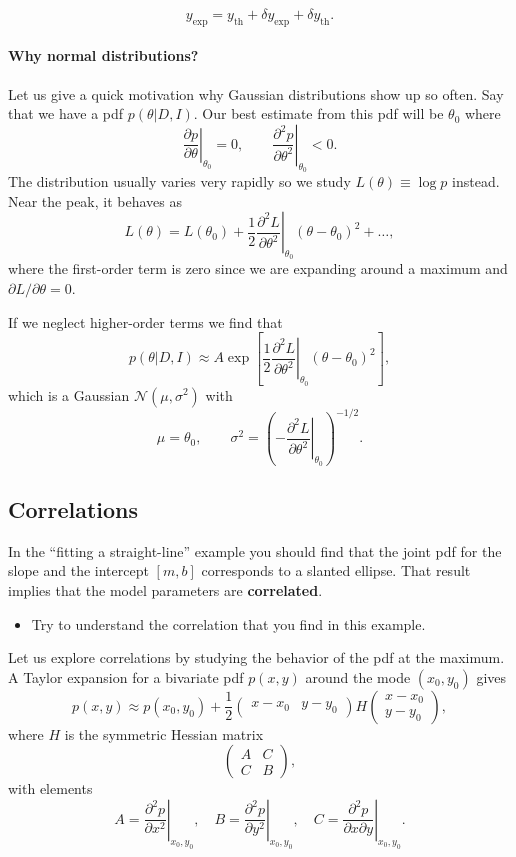 \documentclass[%
oneside,                 %
final,                   %
10pt]{article}
\begin{document}
\noindent
\[
y_\mathrm{exp} = y_\mathrm{th} + \delta y_\mathrm{exp} + \delta y_\mathrm{th}.
\]

\paragraph{Why normal distributions?}
Let us give a quick motivation why Gaussian distributions show up so often. Say that we have a pdf $p(\theta | D,I)$. Our best estimate from this pdf will be $\theta_0$ where
\[ 
\left. 
\frac{ \partial p }{ \partial \theta }
\right|_{\theta_0} = 0, \qquad
\left. \frac{ \partial^2 p }{ \partial \theta^2 }
\right|_{\theta_0} < 0.
\]
The distribution usually varies very rapidly so we study $L(\theta) \equiv \log p$ instead.
Near the peak, it behaves as
\[
L(\theta) = L(\theta_0) + \frac{1}{2} \left. \frac{\partial^2 L}{\partial \theta^2} \right|_{\theta_0} \left( \theta - \theta_0 \right)^2 + \ldots,
\]
where the first-order term is zero since we are expanding around a maximum and $\partial L / \partial\theta = 0$.

If we neglect higher-order terms we find that 
\[
p(\theta|D,I) \approx A \exp \left[ \frac{1}{2} \left. \frac{\partial^2 L}{\partial \theta^2} \right|_{\theta_0} \left( \theta - \theta_0 \right)^2  \right],
\]
which is a Gaussian $\mathcal{N}(\mu,\sigma^2)$ with
\[
\mu = \theta_0, \qquad \sigma^2 = \left( - \left. \frac{\partial^2 L}{\partial \theta^2} \right|_{\theta_0} \right)^{-1/2}.
\]

\subsection{Correlations}
In the ``fitting a straight-line'' example you should find that the joint pdf for the slope and the intercept $[m, b]$ corresponds to a slanted ellipse. That result implies that the model parameters are \textbf{correlated}.

\begin{itemize}
\item Try to understand the correlation that you find in this example.
\end{itemize}

\noindent
Let us explore correlations by studying the behavior of the pdf at the maximum.
A Taylor expansion for a bivariate pdf $p(x,y)$ around the mode $(x_0,y_0)$ gives
\[
p(x,y) \approx p(x_0,y_0) + \frac{1}{2} \begin{pmatrix} x-x_0 & y-y_0 \end{pmatrix}
H
\begin{pmatrix} x-x_0 \\ y-y_0 \end{pmatrix},
\]
where $H$ is the symmetric Hessian matrix
\[
\begin{pmatrix}
A & C \\ C & B
\end{pmatrix}, 
\]
with elements
\[
A = \left. \frac{\partial^2 p}{\partial x^2} \right|_{x_0,y_0}, \quad
B = \left. \frac{\partial^2 p}{\partial y^2} \right|_{x_0,y_0}, \quad
C = \left. \frac{\partial^2 p}{\partial x \partial y} \right|_{x_0,y_0}.
\]
\end{document}
